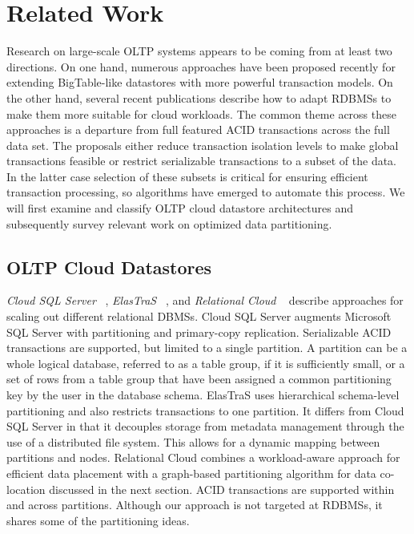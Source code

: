 \documentclass[10pt,final,journal]{IEEEtran}
\begin{document}
\section{Related Work}
Research on large-scale OLTP systems appears to be coming from at least two directions. On one hand, numerous approaches have been proposed recently for extending BigTable-like datastores with more powerful transaction models. On the other hand, several recent publications describe how to adapt RDBMSs to make them more suitable for cloud workloads. The common theme across these approaches is a departure from full featured ACID transactions across the full data set. The proposals either reduce transaction isolation levels to make global transactions feasible or restrict serializable transactions to a subset of the data. In the latter case selection of these subsets is critical for ensuring efficient transaction processing, so algorithms have emerged to automate this process. We will first examine and classify OLTP cloud datastore architectures and subsequently survey relevant work on optimized data partitioning.

\subsection{OLTP Cloud Datastores}
\emph{Cloud SQL Server} ~\cite{Campbell:2010:ESF:1807167.1807280, Bernstein:2011:AMS:2004686.2005651}, \emph{ElasTraS} ~\cite{Das:2009:EET:1855533.1855540, Das:2010:EAE}, and \emph{Relational Cloud} ~\cite{Curino:2011:JPMWMBZ11} describe approaches for scaling out different relational DBMSs. Cloud SQL Server augments Microsoft SQL Server with partitioning and primary-copy replication. Serializable ACID transactions are supported, but limited to a single partition. A partition can be a whole logical database, referred to as a table group, if it is sufficiently small, or a set of rows from a table group that have been assigned a common partitioning key by the user in the database schema. ElasTraS uses hierarchical schema-level partitioning and also restricts transactions to one partition. It differs from Cloud SQL Server in that it decouples storage from metadata management through the use of a distributed file system. This allows for a dynamic mapping between partitions and nodes. Relational Cloud combines a workload-aware approach for efficient data placement with a graph-based partitioning algorithm for data co-location discussed in the next section. ACID transactions are supported within and across partitions. Although our approach is not targeted at RDBMSs, it shares some of the partitioning ideas.
\end{document}
